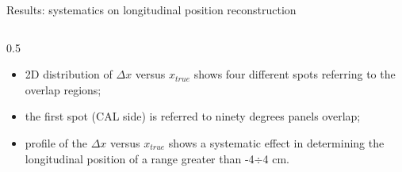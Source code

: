 \documentclass{beamer}[10pt]
\begin{document}
\begin{frame}{Results: systematics on longitudinal position reconstruction}
\begin{columns}
    \begin{column}{0.5\framewidth}
      \begin{itemize}
        \item 2D distribution of $\Delta x$ versus $x_{true}$ shows four different spots referring to the overlap regions;
        \vspace{3mm}
        \item the first spot (CAL side) is referred to ninety degrees panels overlap;
        \vspace{3mm}
        \item  profile of the $\Delta x$ versus $x_{true}$ shows a systematic effect in determining the longitudinal position of a range greater than -4$\div$4 cm.

      \end{itemize}

    
    \end{column}
  \end{columns}
\end{frame}
\end{document}
